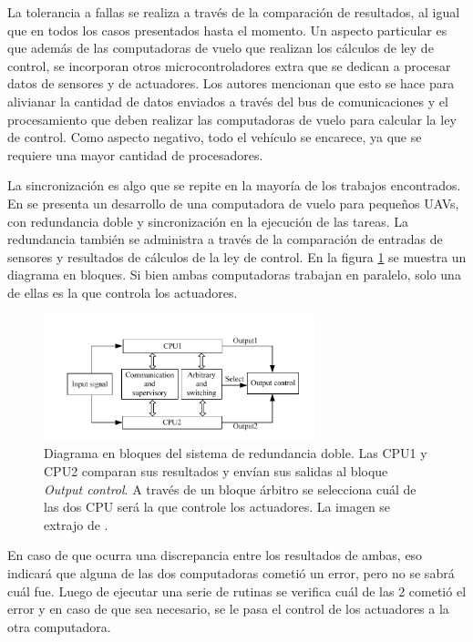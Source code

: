 La tolerancia a fallas se realiza a través de la comparación de resultados, al igual que en todos los casos presentados hasta el momento. Un aspecto particular es que además de las computadoras de vuelo que realizan los cálculos de ley de control, se incorporan otros microcontroladores extra que se dedican a procesar datos de sensores y de actuadores. Los autores mencionan que esto se hace para alivianar la cantidad de datos enviados a través del bus de comunicaciones y el procesamiento que deben realizar las computadoras de vuelo para calcular la ley de control. Como aspecto negativo, todo el vehículo se encarece, ya que se requiere una mayor cantidad de procesadores.

La sincronización es algo que se repite en la mayoría de los trabajos encontrados. En \cite{zhang2015dual} se presenta un desarrollo de una computadora de vuelo para pequeños UAVs, con redundancia doble y sincronización en la ejecución de las tareas. La redundancia también se administra a través de la comparación de entradas de sensores y resultados de cálculos de la ley de control. En la figura \ref{fig:FCC_dual_FPGA} se muestra un diagrama en bloques. Si bien ambas computadoras trabajan en paralelo, solo una de ellas es la que controla los actuadores. 

\begin{figure}[htb]
    \centering
    \includegraphics[width=0.7\textwidth]{img/FCC_dual_FPGA.png}
    \caption{Diagrama en bloques del sistema de redundancia doble. Las CPU1 y CPU2 comparan sus resultados y envían sus salidas al bloque \textit{Output control}. A través de un bloque árbitro se selecciona cuál de las dos CPU será la que controle los actuadores. La imagen se extrajo de \cite{zhang2015dual}.}
    \label{fig:FCC_dual_FPGA}
\end{figure}

En caso de que ocurra una discrepancia entre los resultados de ambas, eso indicará que alguna de las dos computadoras cometió un error, pero no se sabrá cuál fue. Luego de ejecutar una serie de rutinas se verifica cuál de las 2 cometió el error y en caso de que sea necesario, se le pasa el control de los actuadores a la otra computadora.

